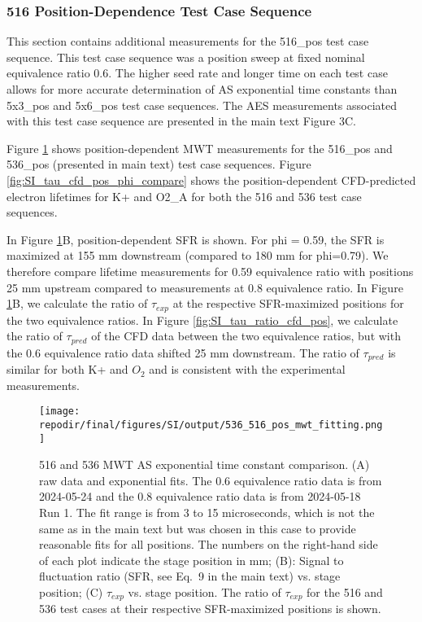 \clearpage
\subsubsection{516 Position-Dependence Test Case Sequence}

This section contains additional measurements for the 516\_pos test case sequence. This test case sequence was a position sweep at fixed nominal equivalence ratio 0.6. The higher seed rate and longer time on each test case allows for more accurate determination of AS exponential time constants than 5x3\_pos and 5x6\_pos test case sequences. The AES measurements associated with this test case sequence are presented in the main text Figure 3C. 

Figure \ref{fig:SI_536_516_pos_mwt_fitting} shows position-dependent MWT measurements for the 516\_pos and 536\_pos (presented in main text) test case sequences. Figure \ref{fig:SI_tau_cfd_pos_phi_compare} shows the position-dependent CFD-predicted electron lifetimes for K+ and O2\_A for both the 516 and 536 test case sequences. 

In Figure \ref{fig:SI_536_516_pos_mwt_fitting}B, position-dependent SFR is shown. For phi = 0.59, the SFR is maximized at 155 mm downstream (compared to 180 mm for phi=0.79). We therefore compare lifetime measurements for 0.59 equivalence ratio with positions 25 mm upstream compared to measurements at 0.8 equivalence ratio. In Figure \ref{fig:SI_536_516_pos_mwt_fitting}B, we calculate the ratio of $\tau_{exp}$ at the respective SFR-maximized positions for the two equivalence ratios. In Figure \ref{fig:SI_tau_ratio_cfd_pos}, we calculate the ratio of $\tau_{pred}$ of the CFD data between the two equivalence ratios, but with the 0.6 equivalence ratio data shifted 25 mm downstream. The ratio of $\tau_{pred}$ is similar for both K+ and $O_2$ and is consistent with the experimental measurements.

\begin{figure}[]
\centering
\texttt{[image: \\repodir/final/figures/SI/output/536\_516\_pos\_mwt\_fitting.png]}
\caption{516 and 536 MWT AS exponential time constant comparison. (A) raw data and exponential fits. The 0.6 equivalence ratio data is from 2024-05-24 and the 0.8 equivalence ratio data is from 2024-05-18 Run 1. The fit range is from 3 to 15 microseconds, which is not the same as in the main text but was chosen in this case to provide reasonable fits for all positions. The numbers on the right-hand side of each plot indicate the stage position in mm; (B): Signal to fluctuation ratio (SFR, see Eq.\ 9 in the main text) vs. stage position; (C) $\tau_{exp}$ vs. stage position. The ratio of $\tau_{exp}$ for the 516 and 536 test cases at their respective SFR-maximized positions is shown.} 
\label{fig:SI_536_516_pos_mwt_fitting}
\end{figure}

